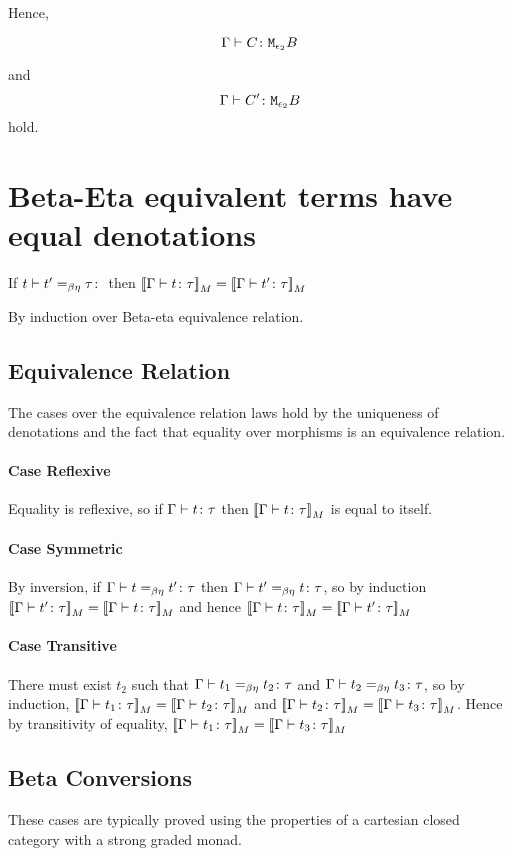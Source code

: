 {    Hence,

    \begin{equation}
        \Gamma \vdash C \colon \texttt{M}_{\epsilon_2}{B}
    \end{equation}

    and 
    \begin{equation}
        \Gamma \vdash C' \colon \texttt{M}_{\epsilon_2}{B}
    \end{equation}
    hold. 


    \section{Beta-Eta equivalent terms have equal denotations}
    If $\berelation{t}{t'}{\tau}$ then ${\bf [\![}\Gamma \vdash t \colon \tau{\bf ]\!]}_M = {\bf [\![}\Gamma \vdash t' \colon \tau{\bf ]\!]}_M$

    By induction over Beta-eta equivalence relation.
    \subsection{Equivalence Relation}
    The cases over the equivalence relation laws hold by the uniqueness of denotations and the fact that equality over morphisms is an equivalence relation.
    \paragraph{Case Reflexive}
    Equality is reflexive, so if $\Gamma \vdash t \colon \tau$ then ${\bf [\![}\Gamma \vdash t \colon \tau{\bf ]\!]}_M$ is equal to itself.
    \paragraph{Case Symmetric}
    By inversion, if $\Gamma \vdash t =_{\beta\eta} t' \colon \tau$ then $\Gamma \vdash t' =_{\beta\eta} t \colon \tau$, so by induction ${\bf [\![}\Gamma \vdash t' \colon \tau{\bf ]\!]}_M = {\bf [\![}\Gamma \vdash t \colon \tau{\bf ]\!]}_M$ and hence ${\bf [\![}\Gamma \vdash t \colon \tau{\bf ]\!]}_M = {\bf [\![}\Gamma \vdash t' \colon \tau{\bf ]\!]}_M$
    \paragraph{Case Transitive}
    There must exist $t_2$ such that $\Gamma \vdash t_1 =_{\beta\eta} t_2 \colon \tau$ and $\Gamma \vdash t_2 =_{\beta\eta} t_3 \colon \tau$, so by induction,
    ${\bf [\![}\Gamma \vdash t_1 \colon \tau{\bf ]\!]}_M = {\bf [\![}\Gamma \vdash t_2 \colon \tau{\bf ]\!]}_M$ and ${\bf [\![}\Gamma \vdash t_2 \colon \tau{\bf ]\!]}_M = {\bf [\![}\Gamma \vdash t_3 \colon \tau{\bf ]\!]}_M$. Hence by transitivity of equality, ${\bf [\![}\Gamma \vdash t_1 \colon \tau{\bf ]\!]}_M = {\bf [\![}\Gamma \vdash t_3 \colon \tau{\bf ]\!]}_M$

    \subsection{Beta Conversions}
    These cases are typically proved using the properties of a cartesian closed category with a strong graded monad.

}
